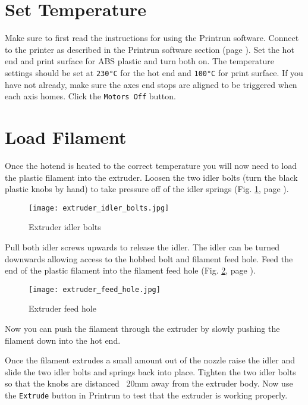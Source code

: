 \section{Set Temperature}
Make sure to first read the instructions for using the Printrun software. Connect to the printer as described in the Printrun software section
(page \pageref{Printrun}). Set the hot end and print surface for ABS plastic and turn both on. The temperature settings should be set at \texttt{230°C} for the hot end and \texttt{100°C} for print surface. If you have not already, make sure the axes end stops are aligned to be triggered when each axis homes. Click the \texttt{Motors Off} button.
\section{Load Filament}
Once the hotend is heated to the correct temperature you will now need to load the plastic filament into the extruder. Loosen the two idler bolts (turn the black plastic knobs by hand) to take pressure off of the idler springs
(Fig. \ref{fig:extruder_idler_bolts}, page \pageref{fig:extruder_idler_bolts}).
\begin{figure}[hbt]
\centering
\texttt{[image: extruder\_idler\_bolts.jpg]}
\caption{Extruder idler bolts}
\label{fig:extruder_idler_bolts}
\end{figure}
Pull both idler screws upwards to release the idler. The idler can be turned downwards allowing access to the hobbed bolt and filament feed hole. Feed the end of the plastic filament into the filament feed hole
(Fig. \ref{fig:extruder_feed_hole}, page \pageref{fig:extruder_feed_hole}).
\begin{figure}[hbt]
\centering
\texttt{[image: extruder\_feed\_hole.jpg]}
\caption{Extruder feed hole}
\label{fig:extruder_feed_hole}
\end{figure}
Now you can push the filament through the extruder by slowly pushing the filament down into the hot end.

Once the filament extrudes a small amount out of the nozzle raise the idler and slide the two idler bolts and springs back into place. Tighten the two idler bolts so that the knobs are distanced ~20mm away from the extruder body. Now use the \texttt{Extrude} button in Printrun to test that the extruder is working properly.

